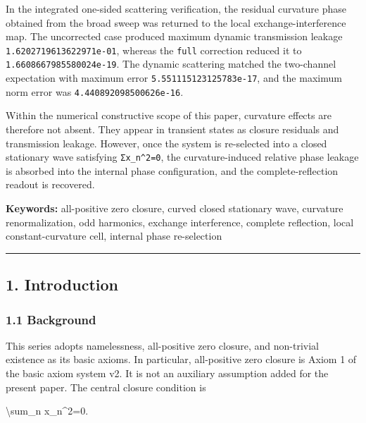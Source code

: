\documentclass[
  a4paper,
]{article}
\newenvironment{Shaded}{}{}
\newcommand{\NormalTok}[1]{#1}
\begin{document}
In the integrated one-sided scattering verification, the residual
curvature phase obtained from the broad sweep was returned to the local
exchange-interference map. The uncorrected case produced maximum dynamic
transmission leakage \texttt{1.6202719613622971e-01}, whereas the
\texttt{full} correction reduced it to \texttt{1.6608667985580024e-19}.
The dynamic scattering matched the two-channel expectation with maximum
error \texttt{5.551115123125783e-17}, and the maximum norm error was
\texttt{4.440892098500626e-16}.

Within the numerical constructive scope of this paper, curvature effects
are therefore not absent. They appear in transient states as closure
residuals and transmission leakage. However, once the system is
re-selected into a closed stationary wave satisfying
\texttt{Σx\_n\^{}2=0}, the curvature-induced relative phase leakage is
absorbed into the internal phase configuration, and the
complete-reflection readout is recovered.

\textbf{Keywords:} all-positive zero closure, curved closed stationary
wave, curvature renormalization, odd harmonics, exchange interference,
complete reflection, local constant-curvature cell, internal phase
re-selection

\begin{center}\rule{0.5\linewidth}{0.5pt}\end{center}

\subsection{1. Introduction}\label{introduction}

\subsubsection{1.1 Background}\label{background}

This series adopts namelessness, all-positive zero closure, and
non-trivial existence as its basic axioms. In particular, all-positive
zero closure is Axiom 1 of the basic axiom system v2. It is not an
auxiliary assumption added for the present paper. The central closure
condition is

\begin{Shaded}
\begin{Highlighting}[]
\NormalTok{\textbackslash{}sum\_n x\_n\^{}2=0.}
\end{Highlighting}
\end{Shaded}
\end{document}
